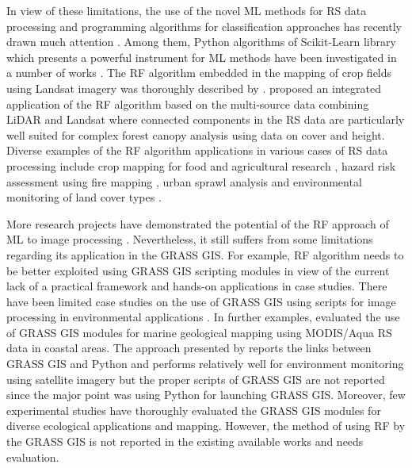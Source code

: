 \documentclass[draft]{agujournal2019}
\begin{document}
In view of these limitations, the use of the novel ML methods for RS data processing and programming algorithms for classification approaches has recently drawn much attention \cite{Ayhan}. Among them, Python algorithms of Scikit-Learn library which presents a powerful instrument for ML methods have been investigated in a number of works \cite{9884244,9883588,9006205,7724471}. The RF algorithm embedded in the mapping of crop fields using Landsat imagery was thoroughly described by \cite{LUCIANO2021106063}. \cite{AHMED201589} proposed an integrated application of the RF algorithm based on the multi-source data combining LiDAR and Landsat where connected components in the RS data are particularly well suited for complex forest canopy analysis using data on cover and height. Diverse examples of the RF algorithm applications in various cases of RS data processing include crop mapping for food and agricultural research \cite{OLIPHANT2019110,TELUGUNTLA2018325}, hazard risk assessment using fire mapping \cite{COLLINS2020111839}, urban sprawl analysis \cite{GHOSH201431} and environmental monitoring of land cover types \cite{MELVILLE201846,GRINAND201368}. 

More research projects have demonstrated the potential of the RF approach of ML to image processing \cite{COLLINS2020111839,WEI2020112005,WANG202294}. Nevertheless, it still suffers from some limitations regarding its application in the GRASS GIS. For example, RF algorithm needs to be better exploited using GRASS GIS scripting modules in view of the current lack of a practical framework and hands-on applications in case studies. There have been limited case studies on the use of GRASS GIS using scripts for image processing in environmental applications \cite{STRIGARO201668,jmse11040871,ROCCHINI2017166,7326254}. In further examples, \cite{7326254} evaluated the use of GRASS GIS modules for marine geological mapping using MODIS/Aqua RS data in coastal areas. The approach presented by \cite{6407912} reports the links between GRASS GIS and Python and performs relatively well for environment monitoring using satellite imagery but the proper scripts of GRASS GIS are not reported since the major point was using Python for launching GRASS GIS. Moreover, few experimental studies have thoroughly evaluated the GRASS GIS modules for diverse ecological applications and mapping. However, the method of using RF by the GRASS GIS is not reported in the existing available works and needs evaluation. 
\end{document}
